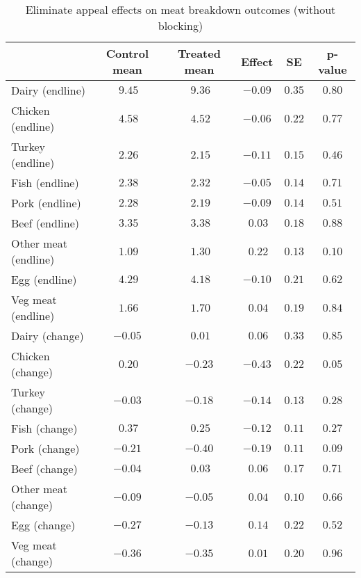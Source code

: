 \begin{table*}[ht]
\caption{Eliminate appeal effects on meat breakdown outcomes (without blocking)\label{round}} 
\begin{center}
\begin{tabular}{lccccc}
\hline\hline
\multicolumn{1}{l}{}&\multicolumn{1}{c}{Control mean}&\multicolumn{1}{c}{Treated mean}&\multicolumn{1}{c}{Effect}&\multicolumn{1}{c}{SE}&\multicolumn{1}{c}{p-value}\tabularnewline
\hline
Dairy (endline)&$~9.45$&$~9.36$&$-0.09$&$0.35$&$0.80$\tabularnewline
Chicken (endline)&$~4.58$&$~4.52$&$-0.06$&$0.22$&$0.77$\tabularnewline
Turkey (endline)&$~2.26$&$~2.15$&$-0.11$&$0.15$&$0.46$\tabularnewline
Fish (endline)&$~2.38$&$~2.32$&$-0.05$&$0.14$&$0.71$\tabularnewline
Pork (endline)&$~2.28$&$~2.19$&$-0.09$&$0.14$&$0.51$\tabularnewline
Beef (endline)&$~3.35$&$~3.38$&$~0.03$&$0.18$&$0.88$\tabularnewline
Other meat (endline)&$~1.09$&$~1.30$&$~0.22$&$0.13$&$0.10$\tabularnewline
Egg (endline)&$~4.29$&$~4.18$&$-0.10$&$0.21$&$0.62$\tabularnewline
Veg meat (endline)&$~1.66$&$~1.70$&$~0.04$&$0.19$&$0.84$\tabularnewline
Dairy (change)&$-0.05$&$~0.01$&$~0.06$&$0.33$&$0.85$\tabularnewline
Chicken (change)&$~0.20$&$-0.23$&$-0.43$&$0.22$&$0.05$\tabularnewline
Turkey (change)&$-0.03$&$-0.18$&$-0.14$&$0.13$&$0.28$\tabularnewline
Fish (change)&$~0.37$&$~0.25$&$-0.12$&$0.11$&$0.27$\tabularnewline
Pork (change)&$-0.21$&$-0.40$&$-0.19$&$0.11$&$0.09$\tabularnewline
Beef (change)&$-0.04$&$~0.03$&$~0.06$&$0.17$&$0.71$\tabularnewline
Other meat (change)&$-0.09$&$-0.05$&$~0.04$&$0.10$&$0.66$\tabularnewline
Egg (change)&$-0.27$&$-0.13$&$~0.14$&$0.22$&$0.52$\tabularnewline
Veg meat (change)&$-0.36$&$-0.35$&$~0.01$&$0.20$&$0.96$\tabularnewline
\hline
\end{tabular}\end{center}

\end{table*}

